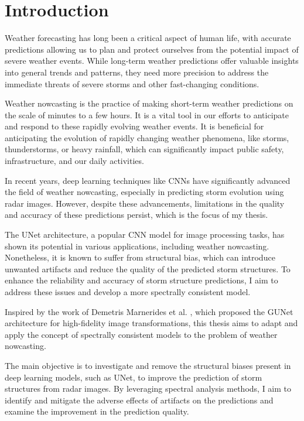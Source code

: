 \chapter{Introduction}
\label{chap:introduction}

Weather forecasting has long been a critical aspect of human life, with accurate predictions allowing us to plan and protect ourselves from the potential impact of severe weather events. While long-term weather predictions offer valuable insights into general trends and patterns, they need more precision to address the immediate threats of severe storms and other fast-changing conditions.

Weather nowcasting is the practice of making short-term weather predictions on the scale of minutes to a few hours. It is a vital tool in our efforts to anticipate and respond to these rapidly evolving weather events. It is beneficial for anticipating the evolution of rapidly changing weather phenomena, like storms, thunderstorms, or heavy rainfall, which can significantly impact public safety, infrastructure, and our daily activities.

In recent years, deep learning techniques like \glspl{CNN} have significantly advanced the field of weather nowcasting, especially in predicting storm evolution using radar images. However, despite these advancements, limitations in the quality and accuracy of these predictions persist, which is the focus of my thesis.

The UNet architecture, a popular \gls{CNN} model for image processing tasks, has shown its potential in various applications, including weather nowcasting. Nonetheless, it is known to suffer from structural bias, which can introduce unwanted artifacts and reduce the quality of the predicted storm structures. To enhance the reliability and accuracy of storm structure predictions, I aim to address these issues and develop a more spectrally consistent model.

Inspired by the work of Demetris Marnerides et al. \cite{gunet}, which proposed the \gls{GUNet} architecture for high-fidelity image transformations, this thesis aims to adapt and apply the concept of spectrally consistent models to the problem of weather nowcasting.

The main objective is to investigate and remove the structural biases present in deep learning models, such as UNet, to improve the prediction of storm structures from radar images. By leveraging spectral analysis methods, I aim to identify and mitigate the adverse effects of artifacts on the predictions and examine the improvement in the prediction quality.

